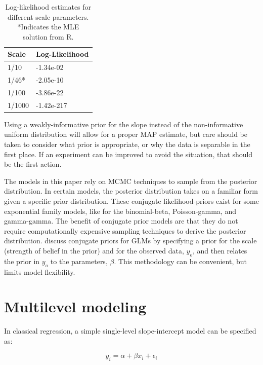 \documentclass[11pt, oneside, openany]{scrbook}
\begin{document}
\begin{table}[!h]

\caption{\label{tab:ch030-Quality-Surreal-Street}Log-likelihood estimates for different scale parameters. *Indicates the MLE solution from R.}
\centering
\begin{tabular}[t]{ll}
\toprule
Scale & Log-Likelihood\\
\midrule
1/10 & -1.34e-02\\
1/46* & -2.05e-10\\
1/100 & -3.86e-22\\
1/1000 & -1.42e-217\\
\bottomrule
\end{tabular}
\end{table}

Using a weakly-informative prior for the slope instead of the non-informative uniform distribution will allow for a proper MAP estimate, but care should be taken to consider what prior is appropriate, or why the data is separable in the first place. If an experiment can be improved to avoid the situation, that should be the first action.

The models in this paper rely on MCMC techniques to sample from the posterior distribution. In certain models, the posterior distribution takes on a familiar form given a specific prior distribution. These conjugate likelihood-priors exist for some exponential family models, like for the binomial-beta, Poisson-gamma, and gamma-gamma. The benefit of conjugate prior models are that they do not require computationally expensive sampling techniques to derive the posterior distribution. \citet{chen2003conjugate} discuss conjugate priors for GLMs by specifying a prior for the scale (strength of belief in the prior) and for the observed data, \(y_o\), and then relates the prior in \(y_o\) to the parameters, \(\beta\). This methodology can be convenient, but limits model flexibility.

\hypertarget{multilevel-modeling}{%
\section{Multilevel modeling}\label{multilevel-modeling}}

In classical regression, a simple single-level slope-intercept model can be specified as:

\begin{equation}
y_i = \alpha + \beta x_i + \epsilon_i
\label{eq:single-level-fixed}
\end{equation}
\end{document}
